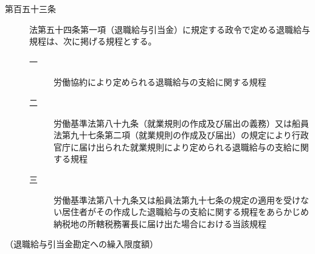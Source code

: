 \documentclass[twocolumn,a4j,10pt]{ltjtarticle}
\begin{document}
\begin{description}
\item[第百五十三条]法第五十四条第一項（退職給与引当金）に規定する政令で定める退職給与規程は、次に掲げる規程とする。
\begin{description}
\item[一]労働協約により定められる退職給与の支給に関する規程
\item[二]労働基準法第八十九条（就業規則の作成及び届出の義務）又は船員法第九十七条第二項（就業規則の作成及び届出）の規定により行政官庁に届け出られた就業規則により定められる退職給与の支給に関する規程
\item[三]労働基準法第八十九条又は船員法第九十七条の規定の適用を受けない居住者がその作成した退職給与の支給に関する規程をあらかじめ納税地の所轄税務署長に届け出た場合における当該規程
\end{description}
\end{description}
\noindent\hspace{10pt}（退職給与引当金勘定への繰入限度額）
\end{document}

